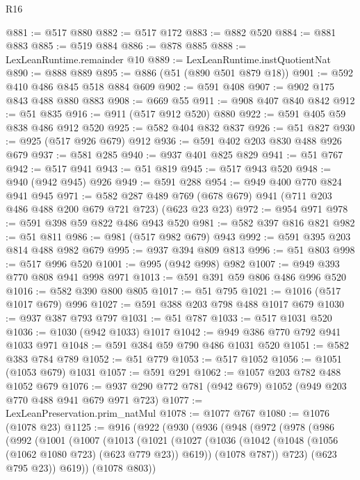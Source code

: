 \begin{lexlean}{R16}
\begin{coremodule}
@881 := @517 @880
@882 := @517 @172
@883 := @882 @520
@884 := @881 @883
@885 := @519 @884
@886 := @878 @885
@888 := LexLeanRuntime.remainder @10
@889 := LexLeanRuntime.instQuotientNat
@890 := @888 @889
@895 := @886 (@51 (@890 @501 @879 @18))
@901 := @592 @410 @486 @845 @518 @884 @609
@902 := @591 @408
@907 := @902 @175 @843 @488 @880 @883
@908 := @669 @55
@911 := @908 @407 @840 @842
@912 := @51 @835
@916 := @911 (@517 @912 @520) @880
@922 := @591 @405 @59 @838 @486 @912 @520
@925 := @582 @404 @832 @837
@926 := @51 @827
@930 := @925 (@517 @926 @679) @912
@936 := @591 @402 @203 @830 @488 @926 @679
@937 := @581 @285
@940 := @937 @401 @825 @829
@941 := @51 @767
@942 := @517 @941
@943 := @51 @819
@945 := @517 @943 @520
@948 := @940 (@942 @945) @926
@949 := @591 @288
@954 := @949 @400 @770 @824 @941 @945
@971 := @582
    @287
    @489
    @769
    (@678 @679)
    @941
    (@711 @203 @486 @488 @200 @679 @721 @723)
    (@623 @23 @23)
@972 := @954 @971
@978 := @591 @398 @59 @822 @486 @943 @520
@981 := @582 @397 @816 @821
@982 := @51 @811
@986 := @981 (@517 @982 @679) @943
@992 := @591 @395 @203 @814 @488 @982 @679
@995 := @937 @394 @809 @813
@996 := @51 @803
@998 := @517 @996 @520
@1001 := @995 (@942 @998) @982
@1007 := @949 @393 @770 @808 @941 @998 @971
@1013 := @591 @391 @59 @806 @486 @996 @520
@1016 := @582 @390 @800 @805
@1017 := @51 @795
@1021 := @1016 (@517 @1017 @679) @996
@1027 := @591 @388 @203 @798 @488 @1017 @679
@1030 := @937 @387 @793 @797
@1031 := @51 @787
@1033 := @517 @1031 @520
@1036 := @1030 (@942 @1033) @1017
@1042 := @949 @386 @770 @792 @941 @1033 @971
@1048 := @591 @384 @59 @790 @486 @1031 @520
@1051 := @582 @383 @784 @789
@1052 := @51 @779
@1053 := @517 @1052
@1056 := @1051 (@1053 @679) @1031
@1057 := @591 @291
@1062 := @1057 @203 @782 @488 @1052 @679
@1076 := @937 @290 @772 @781 (@942 @679) @1052 (@949 @203 @770 @488 @941 @679 @971 @723)
@1077 := LexLeanPreservation.prim_natMul
@1078 := @1077 @767
@1080 := @1076 (@1078 @23)
@1125 := @916
    (@922
      (@930
        (@936
          (@948
            (@972
              (@978
                (@986
                  (@992
                    (@1001
                      (@1007
                        (@1013
                          (@1021
                            (@1027
                              (@1036
                                (@1042 (@1048 (@1056 (@1062 @1080 @723) (@623 @779 @23)) @619))
                                (@1078 @787))
                              @723)
                            (@623 @795 @23))
                          @619))
                      (@1078 @803))

\end{coremodule}
\end{lexlean}
